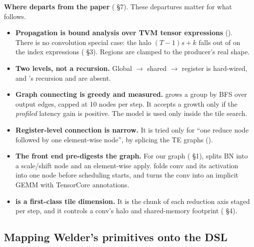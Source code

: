 \textbf{Where  departs from the paper} ( \S7). These
departures matter for what follows.
\begin{itemize}
\item \textbf{Propagation is bound analysis over TVM tensor expressions}
  (). There is no convolution special case: the halo
  $(T-1)s+k$ falls out of  on the index expressions
  ( \S3). Regions are clamped to the producer's real shape.
\item \textbf{Two levels, not a recursion.} Global $\to$ shared $\to$ register is
  hard-wired, and 's recursion and  are
  absent.
\item \textbf{Graph connecting is greedy and measured.}
   grows a group by BFS over output edges, capped at
  10 nodes per step. It accepts a growth only if the \emph{profiled} latency gain is
  positive. The  model is used only inside the tile search.
\item \textbf{Register-level connection is narrow.} It is tried only for ``one reduce
  node followed by one element-wise node'', by splicing the TE graphs
  ().
\item \textbf{The front end pre-digests the graph.} For our graph (
  \S1),  splits BN into a \code{[C]} scale/shift node and an
  element-wise apply.  folds conv and its activation into one
  node before scheduling starts, and  turns the conv
  into an implicit GEMM with TensorCore annotations.
\item \textbf{ is a first-class tile dimension.} It is the chunk of each
  reduction axis staged per step, and it controls a conv's halo and shared-memory
  footprint ( \S4).
\end{itemize}

\subsection{Mapping Welder's primitives onto the DSL}

